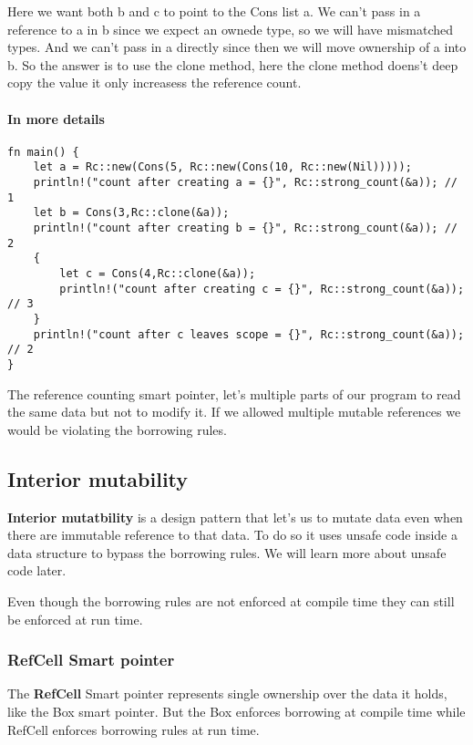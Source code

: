 Here we want both b and c to point to the Cons list a. We can't pass in a reference to a in b since we expect an ownede type, so we will have mismatched types. And we can't pass in a directly since then we will move ownership of a into b.
So the answer is to use the clone method, here the clone method doens't deep copy the value it only increasess the reference count.

\paragraph*{In more details}\begin{lstlisting}
fn main() {
    let a = Rc::new(Cons(5, Rc::new(Cons(10, Rc::new(Nil)))));
    println!("count after creating a = {}", Rc::strong_count(&a)); // 1
    let b = Cons(3,Rc::clone(&a)); 
    println!("count after creating b = {}", Rc::strong_count(&a)); // 2
    {
        let c = Cons(4,Rc::clone(&a));
        println!("count after creating c = {}", Rc::strong_count(&a)); // 3
    }
    println!("count after c leaves scope = {}", Rc::strong_count(&a)); // 2
}
\end{lstlisting}
\begin{remark}
    The reference counting smart pointer, let's multiple parts of our program to read the same data but not to modify it. If we allowed multiple mutable references we would be violating the borrowing rules. 
\end{remark}

\subsection{Interior mutability}
\begin{definition}
    \textbf{Interior mutatbility} is a design pattern that let's us to mutate data even when there are immutable reference to that data. To do so it uses unsafe code inside a data structure to bypass the borrowing rules. We will learn more about unsafe code later.
\end{definition}

Even though the borrowing rules are not enforced at compile time they can still be enforced at run time.

\subsubsection{RefCell Smart pointer}
\begin{definition}
    The \textbf{RefCell} Smart pointer represents single ownership over the data it holds, like the Box smart pointer. But the Box enforces borrowing at compile time while RefCell enforces borrowing rules at run time.
\end{definition}

